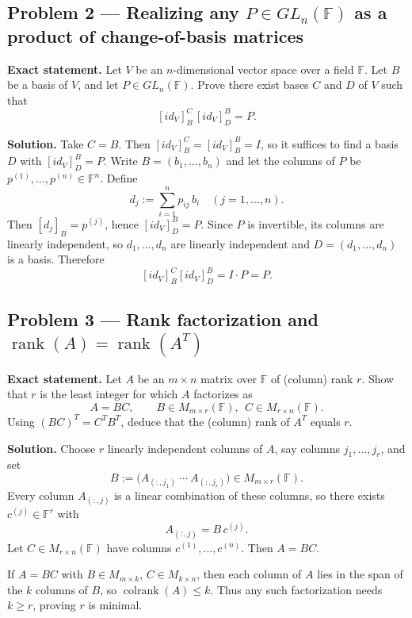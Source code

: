 \documentclass[12pt,a4paper]{article}
\theoremstyle{plain}
\theoremstyle{definition}      %
\begin{document}
\subsection*{Problem 2 — Realizing any \(P\in GL_n(\mathbb F)\) as a product of change-of-basis matrices}

\textbf{Exact statement.}
Let \(V\) be an \(n\)-dimensional vector space over a field \(\mathbb F\). Let \(B\) be a basis of \(V\), and let \(P\in GL_n(\mathbb F)\).
Prove there exist bases \(C\) and \(D\) of \(V\) such that
\[
[id_V]^{C}_{B}\,[id_V]^{B}_{D}=P.
\]

\textbf{Solution.}
Take \(C=B\). Then \([id_V]^C_B=[id_V]^B_B=I\), so it suffices to find a basis \(D\) with \([id_V]^B_D=P\).
Write \(B=(b_1,\dots,b_n)\) and let the columns of \(P\) be \(p^{(1)},\dots,p^{(n)}\in\mathbb F^n\).
Define
\[
d_j := \sum_{i=1}^n p_{ij}\,b_i \quad (j=1,\dots,n).
\]
Then \([d_j]_B=p^{(j)}\), hence \([id_V]^B_D=P\).
Since \(P\) is invertible, its columns are linearly independent, so \(d_1,\dots,d_n\) are linearly independent and \(D=(d_1,\dots,d_n)\) is a basis.
Therefore
\[
[id_V]^C_B[id_V]^B_D=I\cdot P=P.
\]

\subsection*{Problem 3 — Rank factorization and \(\operatorname{rank}(A)=\operatorname{rank}(A^T)\)}

\textbf{Exact statement.}
Let \(A\) be an \(m\times n\) matrix over \(\mathbb F\) of (column) rank \(r\).
Show that \(r\) is the least integer for which \(A\) factorizes as
\[
A = BC,\qquad B\in M_{m\times r}(\mathbb F),\ \ C\in M_{r\times n}(\mathbb F).
\]
Using \((BC)^T=C^T B^T\), deduce that the (column) rank of \(A^T\) equals \(r\).

\textbf{Solution.}
Choose \(r\) linearly independent columns of \(A\), say columns \(j_1,\dots,j_r\), and set
\[
B := \big(A_{(:,j_1)}\ \cdots\ A_{(:,j_r)}\big)\in M_{m\times r}(\mathbb F).
\]
Every column \(A_{(:,j)}\) is a linear combination of these columns, so there exists \(c^{(j)}\in\mathbb F^r\) with
\[
A_{(:,j)}=B\,c^{(j)}.
\]
Let \(C\in M_{r\times n}(\mathbb F)\) have columns \(c^{(1)},\dots,c^{(n)}\). Then \(A=BC\).

If \(A=BC\) with \(B\in M_{m\times k}\), \(C\in M_{k\times n}\), then each column of \(A\) lies in the span of the \(k\) columns of \(B\), so \(\operatorname{colrank}(A)\le k\).
Thus any such factorization needs \(k\ge r\), proving \(r\) is minimal.
\end{document}
